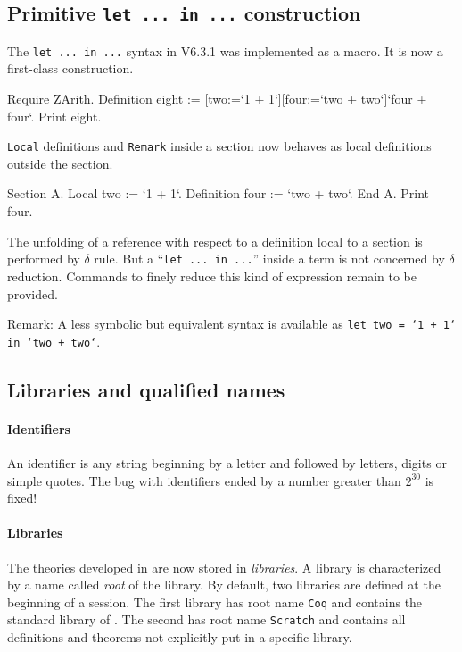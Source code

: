 \documentclass[11pt]{article}
\begin{document}
\label{Language}
\subsection{Primitive {\tt let ... in ...} construction}
\label{Letin}
The {\tt let ... in ...} syntax in V6.3.1 was implemented as a
macro. It is now a first-class construction.

\begin{coq_example}
Require ZArith.
Definition eight := [two:=`1 + 1`][four:=`two + two`]`four + four`. 
Print eight.
\end{coq_example}

{\tt Local} definitions and {\tt Remark} inside a section now behaves
as local definitions outside the section.

\begin{coq_example}
Section A.
Local two := `1 + 1`.
Definition four := `two + two`.
End A.
Print four.
\end{coq_example}

The unfolding of a reference with respect to a definition local to a section
is performed by $\delta$ rule. But a ``{\tt let ... in ...}'' inside a term
is not concerned by $\delta$ reduction. Commands to finely reduce this
kind of expression remain to be provided.
\medskip

Remark: A less symbolic but equivalent syntax is available as {\tt let
two = `1 + 1` in `two + two`}.

\subsection{Libraries and qualified names}
\label{Names}

\paragraph{Identifiers} An identifier is any string beginning by a
letter and followed by letters, digits or simple quotes. The bug
with identifiers ended by a number greater than $2^{30}$ is fixed!

\paragraph{Libraries}

The theories developed in {\Coq} are now stored in {\it libraries}.  A
library is characterized by a name called {\it root} of the
library. By default, two libraries are defined at the beginning of a
{\Coq} session. The first library has root name {\tt Coq} and contains the
standard library of \Coq. The second has root name {\tt Scratch} and
contains all definitions and theorems not explicitly put in a specific
library. 
\end{document}
